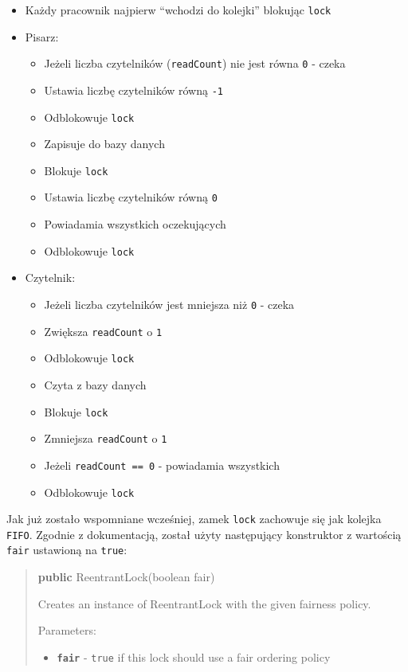 \documentclass[11pt]{article}
\providecommand{\tightlist}{%
      \setlength{\itemsep}{0pt}\setlength{\parskip}{0pt}}
\newenvironment{Shaded}{}{}
\newcommand{\KeywordTok}[1]{\textcolor[rgb]{0.00,0.44,0.13}{\textbf{{#1}}}}
\newcommand{\DataTypeTok}[1]{\textcolor[rgb]{0.56,0.13,0.00}{{#1}}}
\newcommand{\NormalTok}[1]{{#1}}
\newcommand{\OperatorTok}[1]{\textcolor[rgb]{0.40,0.40,0.40}{{#1}}}
\newcommand{\BuiltInTok}[1]{{#1}}
\begin{document}
\begin{itemize}
\tightlist
\item
  Każdy pracownik najpierw ``wchodzi do kolejki'' blokując \texttt{lock}
\item
  Pisarz:

  \begin{itemize}
  \tightlist
  \item
    Jeżeli liczba czytelników (\texttt{readCount}) nie jest równa
    \texttt{0} - czeka
  \item
    Ustawia liczbę czytelników równą \texttt{-1}
  \item
    Odblokowuje \texttt{lock}
  \item
    Zapisuje do bazy danych
  \item
    Blokuje \texttt{lock}
  \item
    Ustawia liczbę czytelników równą \texttt{0}
  \item
    Powiadamia wszystkich oczekujących
  \item
    Odblokowuje \texttt{lock}
  \end{itemize}
\item
  Czytelnik:

  \begin{itemize}
  \tightlist
  \item
    Jeżeli liczba czytelników jest mniejsza niż \texttt{0} - czeka
  \item
    Zwiększa \texttt{readCount} o \texttt{1}
  \item
    Odblokowuje \texttt{lock}
  \item
    Czyta z bazy danych
  \item
    Blokuje \texttt{lock}
  \item
    Zmniejsza \texttt{readCount} o \texttt{1}
  \item
    Jeżeli \texttt{readCount\ ==\ 0} - powiadamia wszystkich
  \item
    Odblokowuje \texttt{lock}
  \end{itemize}
\end{itemize}

Jak już zostało wspomniane wcześniej, zamek \texttt{lock} zachowuje się
jak kolejka \texttt{FIFO}. Zgodnie z dokumentacją, został użyty
następujący konstruktor z wartością \texttt{fair} ustawioną na
\texttt{true}:

\begin{quote}
\begin{Shaded}
\begin{Highlighting}[]
\KeywordTok{public} \BuiltInTok{ReentrantLock}\OperatorTok{(}\DataTypeTok{boolean}\NormalTok{ fair}\OperatorTok{)}
\end{Highlighting}
\end{Shaded}

Creates an instance of ReentrantLock with the given fairness policy.

Parameters:

\begin{itemize}
\tightlist
\item
  \textbf{\texttt{fair}} - \texttt{true} if this lock should use a fair
  ordering policy
\end{itemize}
\end{quote}
\end{document}
